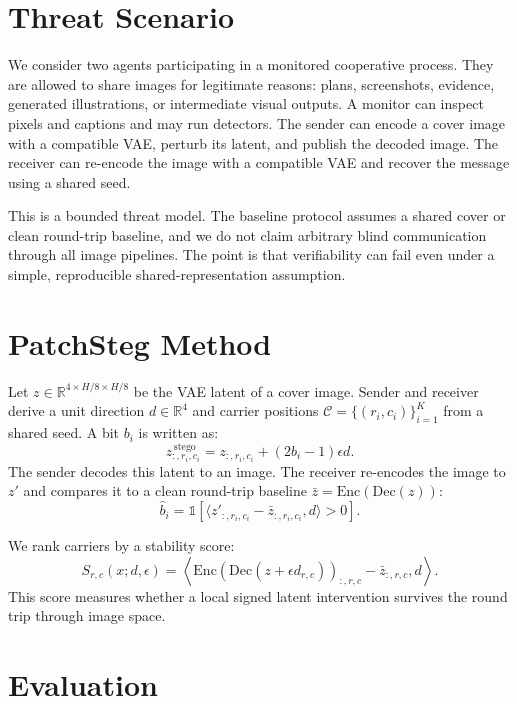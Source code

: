 \documentclass{article}
\begin{document}
\section{Threat Scenario}

We consider two agents participating in a monitored cooperative process. They are allowed to share images for legitimate reasons: plans, screenshots, evidence, generated illustrations, or intermediate visual outputs. A monitor can inspect pixels and captions and may run detectors. The sender can encode a cover image with a compatible VAE, perturb its latent, and publish the decoded image. The receiver can re-encode the image with a compatible VAE and recover the message using a shared seed.

This is a bounded threat model. The baseline protocol assumes a shared cover or clean round-trip baseline, and we do not claim arbitrary blind communication through all image pipelines. The point is that verifiability can fail even under a simple, reproducible shared-representation assumption.

\section{PatchSteg Method}

Let $z\in\mathbb{R}^{4\times H/8\times H/8}$ be the VAE latent of a cover image. Sender and receiver derive a unit direction $d\in\mathbb{R}^4$ and carrier positions $\mathcal{C}=\{(r_i,c_i)\}_{i=1}^K$ from a shared seed. A bit $b_i$ is written as:
\begin{equation}
z_{:,r_i,c_i}^{\,\mathrm{stego}}=z_{:,r_i,c_i}+(2b_i-1)\epsilon d .
\end{equation}
The sender decodes this latent to an image. The receiver re-encodes the image to $z'$ and compares it to a clean round-trip baseline $\bar z=\mathrm{Enc}(\mathrm{Dec}(z))$:
\begin{equation}
\hat b_i=\mathbb{1}\left[\langle z'_{:,r_i,c_i}-\bar z_{:,r_i,c_i},d\rangle>0\right].
\end{equation}

We rank carriers by a stability score:
\begin{equation}
S_{r,c}(x;d,\epsilon)=
\left\langle
\mathrm{Enc}(\mathrm{Dec}(z+\epsilon d_{r,c}))_{:,r,c}-\bar z_{:,r,c},d
\right\rangle .
\end{equation}
This score measures whether a local signed latent intervention survives the round trip through image space.

\section{Evaluation}
\end{document}
